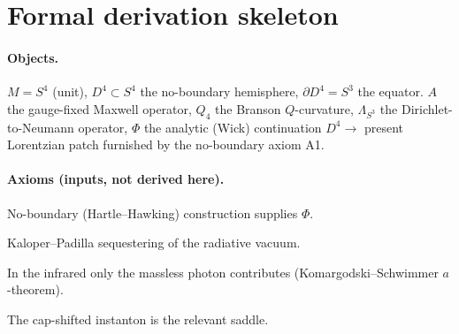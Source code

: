 
\section{Formal derivation skeleton}
\label{sec:formal}

\paragraph{Objects.}
$M=S^4$ (unit), $D^4\subset S^4$ the no-boundary hemisphere, $\partial D^4=S^3$
the equator. $A$ the gauge-fixed Maxwell operator, $Q_4$ the Branson
$Q$-curvature, $\Lambda_{S^3}$ the Dirichlet-to-Neumann operator,
$\Phi$ the analytic (Wick) continuation $D^4\to$ present Lorentzian patch
furnished by the no-boundary axiom A1.

\paragraph{Axioms (inputs, not derived here).}
\begin{description}[nosep,leftmargin=3.4em]
\item[A1] No-boundary (Hartle--Hawking) construction supplies $\Phi$.
\item[A2] Kaloper--Padilla sequestering of the radiative vacuum.
\item[A3] In the infrared only the massless photon contributes
          (Komargodski--Schwimmer $a$-theorem).
\item[B1] The cap-shifted instanton is the relevant saddle.
\end{description}

